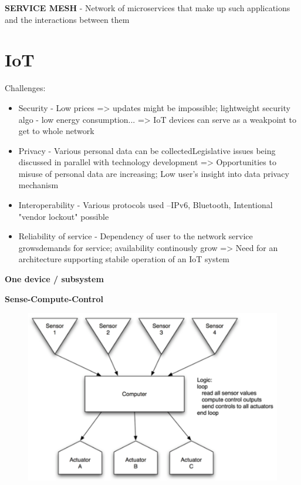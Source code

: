 \textbf{SERVICE MESH} - Network of microservices that make up such applications and the interactions between them

\section{IoT}

Challenges:
\begin{itemize}
    \item Security - Low prices => updates might be impossible; lightweight security algo - low energy consumption... => IoT devices can serve as a weakpoint to get to whole network
    \item Privacy - Various personal data can be collectedLegislative issues being discussed in parallel with technology development => Opportunities to misuse of personal data are increasing; Low user's insight into data privacy mechanism
    \item Interoperability - Various protocols used –IPv6, Bluetooth, Intentional "vendor lockout" possible
    \item Reliability of service - Dependency of user to the network service growsdemands for service; availability continously grow => Need for an architecture supporting stabile operation of an IoT system
\end{itemize}


\textbf{One device / subsystem}

\textbf{Sense-Compute-Control}
\begin{figure}[ht!]
\centering
\includegraphics[width=.7\textwidth]{oborove/SWA/img/SCC.png}
\end{figure}
\pagebreak

